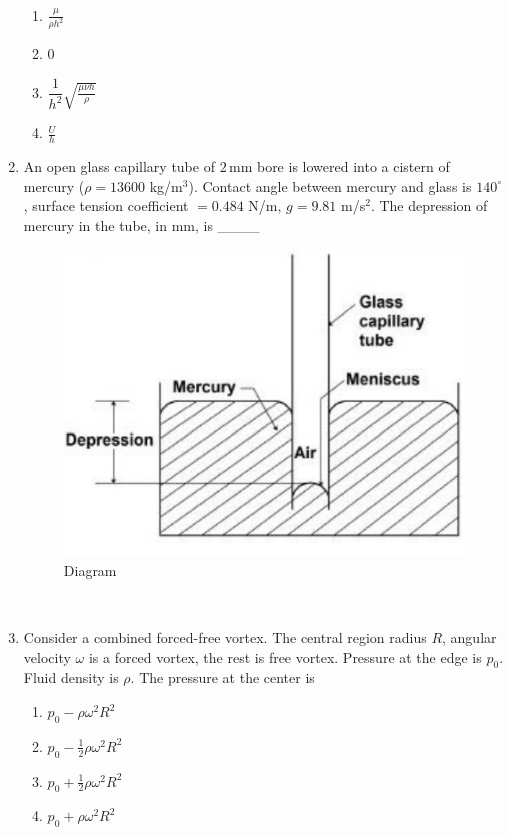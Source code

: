 \documentclass[journal,12pt,onecolumn]{IEEEtran}
\begin{document}
\begin{enumerate}[label=\arabic*)]
\hfill{} \\
\vspace{0.2cm}
\begin{enumerate}[label=\alph*)]
\item $\frac{\mu}{\rho h^2}$
\vspace{0.1cm}
\item $0$
\item $\dfrac{1}{h^2} \sqrt{\frac{\mu \nu h}{\rho}}$
\vspace{0.1cm}
\item $\frac{U}{h}$
\end{enumerate}
\vspace{0.5cm}

\item An open glass capillary tube of $2\,\mathrm{mm}$ bore is lowered into a cistern of mercury ($\rho=13600$ kg/m$^3$). Contact angle between mercury and glass is $140^\circ$, surface tension coefficient $=0.484$ N/m, $g=9.81$ m/s$^2$. The depression of mercury in the tube, in mm, is \_\_\_\_

\begin{figure}[htbp]
  \centering
  \includegraphics[width=.38\linewidth]{figs/B/fig2.png} 
  \caption{Diagram}
  \label{B/fig2}
\end{figure}

\hfill{} \\

\newpage

\item Consider a combined forced-free vortex. The central region radius $R$, angular velocity $\omega$ is a forced vortex, the rest is free vortex. Pressure at the edge is $p_0$. Fluid density is $\rho$. The pressure at the center is  
\hfill{} \\

\vspace{0.2cm}
\begin{enumerate}[label=\alph*)]
\item $p_0 - \rho \omega^2 R^2$
\item $p_0 - \tfrac12 \rho \omega^2 R^2$
\item $p_0 + \tfrac12 \rho \omega^2 R^2$
\item $p_0 + \rho \omega^2 R^2$
\end{enumerate}
\vspace{0.5cm}


\end{enumerate}
\end{document}
